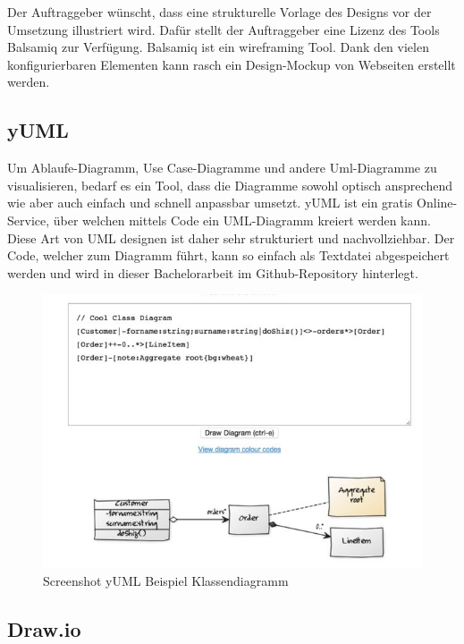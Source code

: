 Der Auftraggeber wünscht, dass eine strukturelle Vorlage des Designs vor
der Umsetzung illustriert wird. Dafür stellt der Auftraggeber eine
Lizenz des Tools Balsamiq zur Verfügung. Balsamiq ist ein wireframing
Tool. Dank den vielen konfigurierbaren Elementen kann rasch ein
Design-Mockup von Webseiten erstellt werden.

\newpage

\subsection{yUML}\label{yuml}

Um Ablaufe-Diagramm, Use Case-Diagramme und andere Uml-Diagramme zu
visualisieren, bedarf es ein Tool, dass die Diagramme sowohl optisch
ansprechend wie aber auch einfach und schnell anpassbar umsetzt. yUML
ist ein gratis Online-Service, über welchen mittels Code ein
UML-Diagramm kreiert werden kann. Diese Art von UML designen ist daher
sehr strukturiert und nachvollziehbar. Der Code, welcher zum Diagramm
führt, kann so einfach als Textdatei abgespeichert werden und wird in
dieser Bachelorarbeit im Github-Repository hinterlegt.

\begin{figure}[htbp]
\centering
\includegraphics{images/yuml.JPG}
\caption{Screenshot yUML Beispiel Klassendiagramm}
\end{figure}

\subsection{Draw.io}\label{draw.io}

